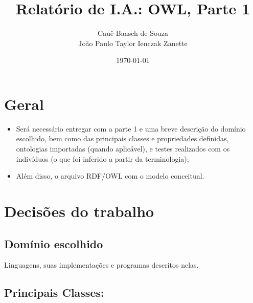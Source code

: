 \documentclass[answers]{exam}
\title{Relatório de I.A.: OWL, Parte 1}
\author{Cauê Baasch de Souza \\
        João Paulo Taylor Ienczak Zanette}
\date{\today}
\newcommand{\todo}[1]{{\color{red}{#1}}}
\begin{document}
    \maketitle{}

    \todo{%
        TO-DO\@:
        \begin{itemize}
            \item Adicionar enunciado da 2ª parte (parte prática);
            \item Escolher domínio dos exemplos.
        \end{itemize}
    }

    \section{Geral}

    \begin{superframe}
        \begin{itemize}
            \item Será necessário entregar com a parte 1 e uma breve descrição
                do domínio escolhido, bem como das principais classes e
                propriedades definidas, ontologias importadas (quando
                aplicável), e testes realizados com os indivíduos (o que foi
                inferido a partir da terminologia);

            \item Além disso, o arquivo RDF/OWL com o modelo conceitual.
        \end{itemize}
    \end{superframe}

    \section{Decisões do trabalho}

    \subsection{Domínio escolhido}

    Linguagens, suas implementações e programas descritos nelas.

    \subsection{Principais Classes:}
\end{document}
